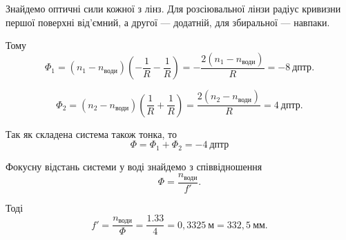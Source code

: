 \begin{solutionexample}

	Знайдемо оптичні сили кожної з лінз. Для розсіювальної лінзи радіус
	кривизни першої поверхні від’ємний, а другої --- додатній, для збиральної ---
	навпаки.

	Тому
	\begin{equation*}
		\Phi_1 = (n_1 - n_\text{води})\left(-\frac{1}{R} - \frac{1}{R}\right) = -\frac{2(n_1 - n_\text{води})}{R} = - 8\ \text{дптр}.
	\end{equation*}

	\begin{equation*}
		\Phi_2 = (n_2 - n_\text{води})\left(\frac{1}{R} + \frac{1}{R}\right) = \frac{2(n_2 - n_\text{води})}{R} = 4\ \text{дптр}.
	\end{equation*}

	Так як складена система також тонка, то
	\begin{equation*}
		\Phi = \Phi_1 + \Phi_2 = -4\ \text{дптр}
	\end{equation*}

	Фокусну відстань системи у воді знайдемо з співвідношення
	\begin{equation*}
		\Phi = \frac{n_\text{води}}{f'}.
	\end{equation*}

	Тоді
	\begin{equation*}
		f' = \frac{n_\text{води}}{\Phi} = \frac{1.33}{4} = 0,3325\ \text{м} = 332,5 \ \text{мм}.
	\end{equation*}
\end{solutionexample}

